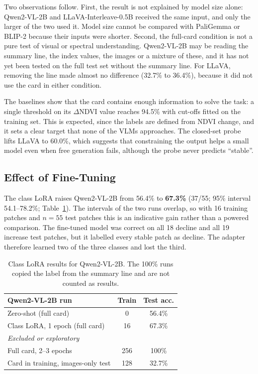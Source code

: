 \documentclass[11pt]{article}
\begin{document}
Two observations follow. First, the result is not explained by model
size alone: Qwen2-VL-2B and LLaVA-Interleave-0.5B received the same
input, and only the larger of the two used it. Model size cannot be
compared with PaliGemma or BLIP-2 because their inputs were shorter.
Second, the full-card condition is not a pure test of visual or spectral
understanding. Qwen2-VL-2B may be reading the summary line, the index
values, the images or a mixture of these, and it has not yet been tested
on the full test set without the summary line. For LLaVA, removing the
line made almost no difference (32.7\% to 36.4\%), because it did not
use the card in either condition.

The baselines show that the card contains enough information to solve
the task: a single threshold on its $\Delta$NDVI value reaches 94.5\%
with cut-offs fitted on the training set. This is expected, since the
labels are defined from NDVI change, and it sets a clear target that
none of the VLMs approaches. The closed-set probe lifts LLaVA to 60.0\%,
which suggests that constraining the output helps a small model even
when free generation fails, although the probe never predicts
``stable''.

\subsection{Effect of Fine-Tuning}

The class LoRA raises Qwen2-VL-2B from 56.4\% to \textbf{67.3\%} (37/55;
95\% interval 54.1--78.2\%; Table~\ref{tab:lora}). The intervals of the
two runs overlap, so with 16 training patches and $n = 55$ test patches
this is an indicative gain rather than a powered comparison. The
fine-tuned model was correct on all 18 decline and all 19 increase test
patches, but it labelled every stable patch as decline. The adapter
therefore learned two of the three classes and lost the third.

\begin{table}[t]
\centering
\small
\begin{tabular}{@{}lcc@{}}
\toprule
Qwen2-VL-2B run & Train & Test acc. \\
\midrule
Zero-shot (full card) & 0 & 56.4\% \\
Class LoRA, 1 epoch (full card) & 16 & 67.3\% \\
\midrule
\multicolumn{3}{l}{\emph{Excluded or exploratory}} \\
Full card, 2--3 epochs & 256 & 100\% \\
Card in training, images-only test & 128 & 32.7\% \\
\bottomrule
\end{tabular}
\caption{Class LoRA results for Qwen2-VL-2B. The 100\% runs copied the
label from the summary line and are not counted as results.}
\label{tab:lora}
\end{table}
\end{document}
